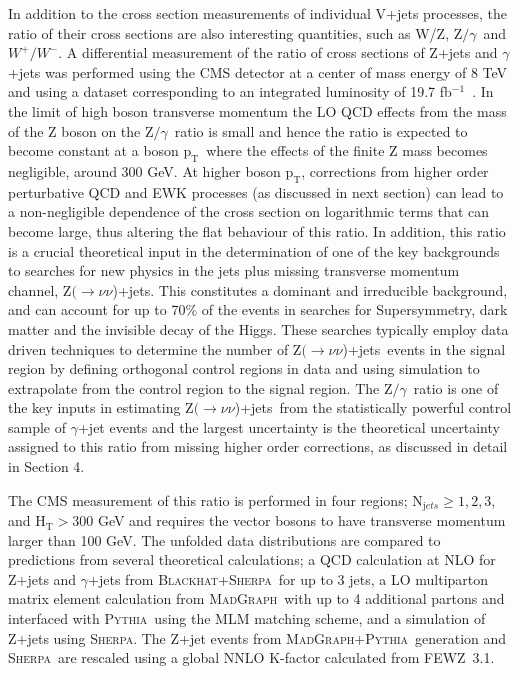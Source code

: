 \documentclass[a4paper,11pt,notoc]{article}
\newcommand{\Znunuj}   {\mbox{${\mathrm Z}(\rightarrow\nu \nu$)+jets}}
\newcommand{\pt}{\ensuremath{\mathrm{p_T}}}
\newcommand{\Ht}{\ensuremath{\mathrm{H_T}}}
\newcommand{\PYTHIA}{\textsc{Pythia}}
\newcommand{\SHERPA}{\textsc{Sherpa}}
\newcommand{\BLACKHAT}{\textsc{Blackhat}}
\newcommand{\FEWZ}{\textsc{FEWZ}}
\newcommand{\MADGRAPH}{\textsc{MadGraph}}
\newcommand{\zgamma}{\mbox{${\mathrm Z/\gamma}$}}
\begin{document}
In addition to the cross section measurements of individual V+jets processes, the ratio of their cross sections are also interesting quantities, such as W/Z, \zgamma\ and $W^{+}/W^{-}$.
A differential measurement of the ratio of cross sections of Z+jets and $\gamma$+jets was performed using the CMS detector at a center of mass energy of 8 TeV and using a dataset corresponding to an integrated luminosity of 19.7 fb$^{-1}$~\cite{Khachatryan:2015ira}. 
In the limit of high boson transverse momentum the LO QCD effects from the mass of the Z boson on the \zgamma\ ratio is small and hence the ratio is expected to become constant at a boson \pt\ where the effects of the finite Z mass becomes negligible, around 300 GeV. At higher boson \pt, corrections from higher order perturbative QCD and EWK processes (as discussed in next section) can lead to a non-negligible dependence of the cross section on logarithmic terms that can become large, thus altering the flat behaviour of this ratio. 
In addition, this ratio is a crucial theoretical input in the determination of one of the key backgrounds to searches for new physics in the jets plus missing transverse momentum channel, \Znunuj. This constitutes a dominant and irreducible background, and can account for up to 70\% of the events in searches for Supersymmetry, dark matter and the invisible decay of the Higgs. These searches typically employ data driven techniques to determine the number of \Znunuj\ events in the signal region by defining orthogonal control regions in data and using simulation to extrapolate from the control region to the signal region. The \zgamma\ ratio is one of the key inputs in estimating \Znunuj\ from the statistically powerful control sample of $\gamma$+jet events and the largest uncertainty is the theoretical uncertainty assigned to this ratio from missing higher order corrections, as discussed in detail in Section 4. 

The CMS measurement of this ratio is performed in four regions; N$_{\mathrm jets} \ge 1, 2, 3$, and $\Ht > 300$ GeV and requires the vector bosons to have transverse momentum larger than 100 GeV. The unfolded data distributions are compared to predictions from several theoretical calculations; a QCD calculation at NLO for Z+jets and $\gamma$+jets from \BLACKHAT+\SHERPA\ for up to 3 jets, a LO multiparton matrix element calculation from \MADGRAPH\ with up to 4 additional partons and interfaced with \PYTHIA\ using the MLM matching scheme, and a simulation of Z+jets using \SHERPA.   
The Z+jet events from \MADGRAPH+\PYTHIA\ generation and \SHERPA\ are rescaled using a global NNLO K-factor calculated from \FEWZ\ 3.1.
\end{document}
